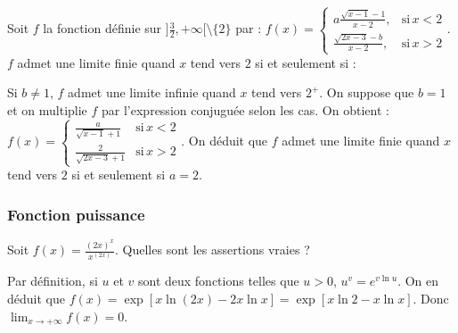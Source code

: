 \begin{question}

Soit  $f$ la fonction définie sur $]\frac{3}{2}, +\infty[ \setminus \{2\}$  par : $f(x)=\left\{\begin{array}{cc}a\frac{\sqrt{x-1}-1}{x-2},& \mbox{si} \, x<2  \\ \frac{\sqrt{2x-3}-b}{x-2},&  \mbox{si} \, x >2  \end{array}\right.$. $f$ admet une limite  finie quand $x$ tend vers $2$ si et seulement si :
\begin{answers}

    
      
    
    
\end{answers}
\begin{explanations}
Si $b\neq 1$, $f$ admet une limite infinie quand $x$ tend vers $2^+$. On suppose que $b=1$ et on multiplie $f$ par l'expression conjuguée selon les  cas. On obtient : 
$f(x)=\left\{\begin{array}{cc} \frac{a}{\sqrt{x-1}+1}& \mbox{si} \, x<2  \\ \frac{2}{\sqrt{2x-3}+1}&  \mbox{si} \, x >2  \end{array}\right.$. On déduit que $f$ admet une limite  finie quand $x$ tend vers $2$ si et seulement si $a=2$.
\end{explanations}

\end{question}


\subsubsection{Fonction puissance}


\begin{question}
 
Soit  $f(x)=\frac{(2x)^x}{x^{(2x)}}$. Quelles sont les assertions vraies ?
\begin{answers}

    
       
    

\end{answers}
\begin{explanations}
Par définition, si $u$ et $v$ sont deux fonctions telles  que $u>0$, $u^v=e^{v\ln u}$. On en déduit que $f(x)=\exp[ x\ln (2x )- 2x\ln x] =  \exp[ x\ln 2 - x\ln x]$. Donc $\lim_{x\to +\infty } f(x)=0$.
\end{explanations}

\end{question}









